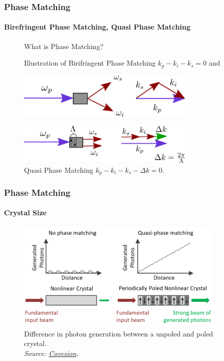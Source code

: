 \documentclass[serif,8pt]{beamer}
\begin{document}
\begin{frame}
	\frametitle{Phase Matching}
	\framesubtitle{Birefringent Phase Matching, Quasi Phase Matching}
\begin{figure}
	What is Phase Matching?
		\begin{center}
		\caption{Illustration of Birifringent Phase Matching $k_p - k_i - k_s = 0$ and}
		  \includegraphics[width=8.5cm]{SPDCkPM.png}\\
		\caption{Quasi Phase Matching $k_p - k_i -k_s - \Delta k = 0$.}
		  \includegraphics[width=8.5cm]{SPDCkQPM.png}
		\end{center}
		\label{fig:SPDCk}
	\end{figure}
\end{frame}


\begin{frame}[t]
	\frametitle{Phase Matching}
	\framesubtitle{Crystal Size}
	\begin{figure}
		\caption{Difference in photon generation between a unpoled and poled crystal.\\\textit{Source: \href{https://covesion.com/en/resource/principles-of-nonlinear-frequency-conversion/}{Covesion}.}}
		\begin{center}
			\includegraphics[width=10cm]{PolledVsNot.png}
		\end{center}
		\label{fig:poledvsnot}
	\end{figure}
\end{frame}
\end{document}
